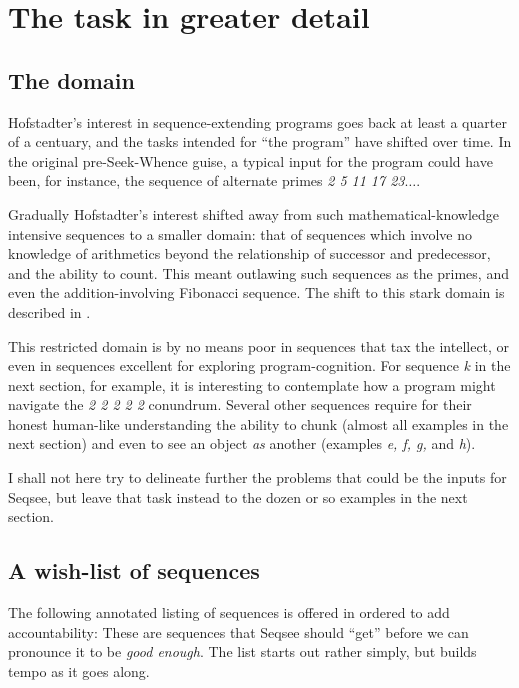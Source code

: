 
% 

\section{The task in greater detail}
\label{sec:task}


\subsection{The domain}
\label{sec:domain}
Hofstadter's interest in sequence-extending programs goes back at least a quarter of a centuary, and the tasks intended for ``the program'' have shifted over time. In the original pre-Seek-Whence guise, a typical input for the program could have been, for instance, the sequence of alternate primes \emph{2 5 11 17 23$\ldots$}.

Gradually Hofstadter's interest shifted away from such mathematical-knowledge intensive sequences to a smaller domain: that of sequences which involve no knowledge of arithmetics beyond the relationship of successor and predecessor, and the ability to count. This meant outlawing such sequences as the primes, and even the addition-involving Fibonacci sequence. The shift to this stark domain is described in .

This restricted domain is by no means poor in sequences that tax the intellect, or even in sequences excellent for exploring program-cognition. For sequence \emph{k} in the next section, for example, it is interesting to contemplate how a program might navigate the \emph{2 2 2 2 2} conundrum. Several other sequences require for their honest human-like understanding the ability to chunk (almost all examples in the next section) and even to see an object \emph{as} another (examples \emph{e, f, g, } and \emph{h}).

I shall not here try to delineate further the problems that could be the inputs for Seqsee, but leave that task instead to the dozen or so examples in the next section.

\subsection{A wish-list of sequences}
\label{sec:list}

The following annotated listing of sequences is offered in ordered to add accountability: These are sequences that Seqsee should ``get'' before we can pronounce it to be \emph{good enough}. The list starts out rather simply, but builds tempo as it goes along.

